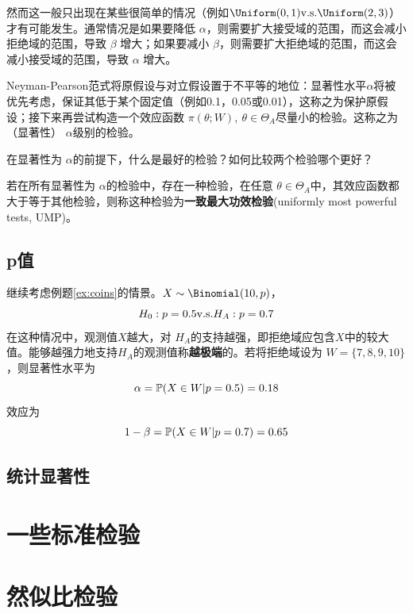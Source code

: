 然而这一般只出现在某些很简单的情况（例如$\Uniform(0,1) \vs \Uniform(2,3)$）才有可能发生。通常情况是如果要降低 $\alpha$，则需要扩大接受域的范围，而这会减小拒绝域的范围，导致 $\beta$ 增大；如果要减小 $\beta$，则需要扩大拒绝域的范围，而这会减小接受域的范围，导致 $\alpha$ 增大。

Neyman-Pearson范式将原假设与对立假设置于不平等的地位：显著性水平$\alpha$将被优先考虑，保证其低于某个固定值（例如0.1，0.05或0.01），这称之为保护原假设；接下来再尝试构造一个效应函数 $\pi(\theta;W),\ \theta \in \Theta_A$尽量小的检验。这称之为（显著性） $\alpha$级别的检验。

在显著性为 $\alpha$的前提下，什么是最好的检验？如何比较两个检验哪个更好？

\begin{definition}[一致最大功效检验]
    若在所有显著性为 $\alpha$的检验中，存在一种检验，在任意 $\theta \in \Theta_A$中，其效应函数都大于等于其他检验，则称这种检验为\textbf{一致最大功效检验}(uniformly most powerful tests, UMP)。
\end{definition}

\subsection{p值}

继续考虑例题\ref{ex:coins}的情景。$X \sim \Binomial(10, p)$，
\[ H_0: p=0.5 \vs H_A : p = 0.7 \]
在这种情况中，观测值$X$越大，对 $H_A$的支持越强，即拒绝域应包含$X$中的较大值。能够越强力地支持$H_A$的观测值称\textbf{越极端}的。若将拒绝域设为 $W=\{ 7,8,9,10 \}$，则显著性水平为
\[ \alpha = \P(X \in W|p=0.5) = 0.18 \]
效应为
\[ 1-\beta= \P(X \in W|p=0.7)=0.65\]

\begin{definition}
    
\end{definition}

\subsection{统计显著性}

\section{一些标准检验}

\section{然似比检验}

